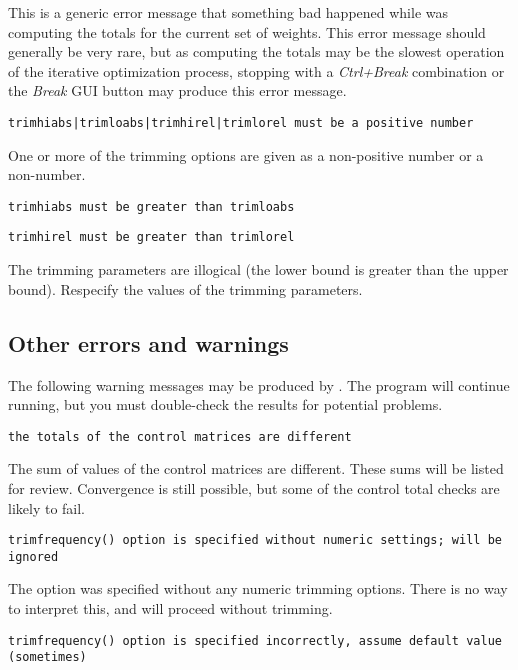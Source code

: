     \morehang
    This is a generic error message that something bad happened while
     was computing the totals for the current set of weights.
    This error message should generally be very rare, but as computing
    the totals may be the slowest operation of the iterative optimization
    process, stopping  with a {\it Ctrl+Break} combination or
    the {\it Break} GUI button may produce this error message.

    \noindent
    {\tt trimhiabs|trimloabs|trimhirel|trimlorel must be a positive number}

    \morehang
    One or more of the trimming options are given as a non-positive number
    or a non-number.

    \noindent
    {\tt trimhiabs must be greater than trimloabs}

    \noindent
    {\tt trimhirel must be greater than trimlorel}

    \morehang
    The trimming parameters are illogical (the lower bound is greater than the upper bound).
    Respecify the values of the trimming parameters.

\bigskip

\subsection{Other errors and warnings}

The following warning messages may be produced by
. The program will continue running, but you must
double-check the results for potential problems.

\noindent
    {\tt the totals of the control matrices are different}

    \morehang
    The sum of values of the control matrices are different.
    These sums will be listed for review. Convergence is still
    possible, but some of the control total checks are likely to fail.

    \noindent
    {\tt trimfrequency() option is specified without numeric settings; will be \\ ignored}

    \morehang
    The option  was specified without any numeric trimming options.
    There is no way to interpret this, and  will proceed without
    trimming.

    \noindent
    {\tt trimfrequency() option is specified incorrectly, assume default value \\ (sometimes)}

